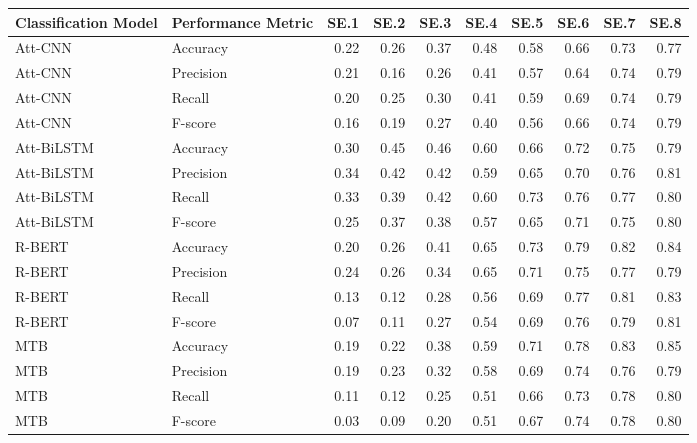\begin{tabular}{llrrrrrrrr}
\toprule
Classification Model & Performance Metric & SE.1 & SE.2 & SE.3 & SE.4 & SE.5 & SE.6 & SE.7 & SE.8 \\
\midrule
Att-CNN & Accuracy & 0.22 & 0.26 & 0.37 & 0.48 & 0.58 & 0.66 & 0.73 & 0.77 \\
Att-CNN & Precision & 0.21 & 0.16 & 0.26 & 0.41 & 0.57 & 0.64 & 0.74 & 0.79 \\
Att-CNN & Recall & 0.20 & 0.25 & 0.30 & 0.41 & 0.59 & 0.69 & 0.74 & 0.79 \\
Att-CNN & F-score & 0.16 & 0.19 & 0.27 & 0.40 & 0.56 & 0.66 & 0.74 & 0.79 \\
Att-BiLSTM & Accuracy & 0.30 & 0.45 & 0.46 & 0.60 & 0.66 & 0.72 & 0.75 & 0.79 \\
Att-BiLSTM & Precision & 0.34 & 0.42 & 0.42 & 0.59 & 0.65 & 0.70 & 0.76 & 0.81 \\
Att-BiLSTM & Recall & 0.33 & 0.39 & 0.42 & 0.60 & 0.73 & 0.76 & 0.77 & 0.80 \\
Att-BiLSTM & F-score & 0.25 & 0.37 & 0.38 & 0.57 & 0.65 & 0.71 & 0.75 & 0.80 \\
R-BERT & Accuracy & 0.20 & 0.26 & 0.41 & 0.65 & 0.73 & 0.79 & 0.82 & 0.84 \\
R-BERT & Precision & 0.24 & 0.26 & 0.34 & 0.65 & 0.71 & 0.75 & 0.77 & 0.79 \\
R-BERT & Recall & 0.13 & 0.12 & 0.28 & 0.56 & 0.69 & 0.77 & 0.81 & 0.83 \\
R-BERT & F-score & 0.07 & 0.11 & 0.27 & 0.54 & 0.69 & 0.76 & 0.79 & 0.81 \\
MTB & Accuracy & 0.19 & 0.22 & 0.38 & 0.59 & 0.71 & 0.78 & 0.83 & 0.85 \\
MTB & Precision & 0.19 & 0.23 & 0.32 & 0.58 & 0.69 & 0.74 & 0.76 & 0.79 \\
MTB & Recall & 0.11 & 0.12 & 0.25 & 0.51 & 0.66 & 0.73 & 0.78 & 0.80 \\
MTB & F-score & 0.03 & 0.09 & 0.20 & 0.51 & 0.67 & 0.74 & 0.78 & 0.80 \\
\bottomrule
\end{tabular}
